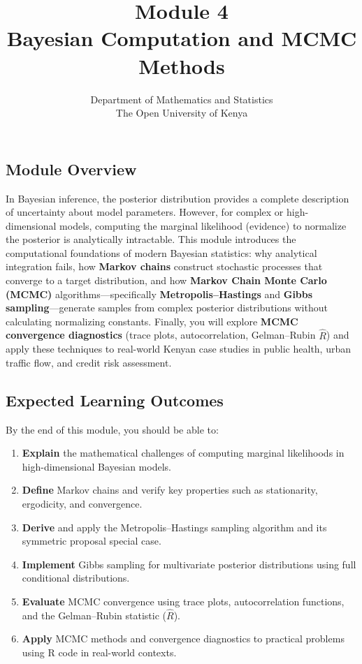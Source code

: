 \documentclass[12pt,a4paper]{article}
\title{\color{moduleblue}\Huge \textbf{Module 4}\\[0.3em]
\Large Bayesian Computation and MCMC Methods}
\author{Department of Mathematics and Statistics\\ The Open University of Kenya}
\date{}
\begin{document}
\maketitle

\begin{tcolorbox}[colback=moduleblue!6, colframe=moduleblue, arc=2mm, boxrule=1pt]
\subsection*{Module Overview}
In Bayesian inference, the posterior distribution provides a complete description of uncertainty about model parameters. However, for complex or high-dimensional models, computing the marginal likelihood (evidence) to normalize the posterior is analytically intractable. This module introduces the computational foundations of modern Bayesian statistics: why analytical integration fails, how \textbf{Markov chains} construct stochastic processes that converge to a target distribution, and how \textbf{Markov Chain Monte Carlo (MCMC)} algorithms---specifically \textbf{Metropolis--Hastings} and \textbf{Gibbs sampling}---generate samples from complex posterior distributions without calculating normalizing constants. Finally, you will explore \textbf{MCMC convergence diagnostics} (trace plots, autocorrelation, Gelman--Rubin $\hat{R}$) and apply these techniques to real-world Kenyan case studies in public health, urban traffic flow, and credit risk assessment.
\end{tcolorbox}

\subsection*{Expected Learning Outcomes}

By the end of this module, you should be able to:
\begin{enumerate}
    \item \textbf{Explain} the mathematical challenges of computing marginal likelihoods in high-dimensional Bayesian models.
    \item \textbf{Define} Markov chains and verify key properties such as stationarity, ergodicity, and convergence.
    \item \textbf{Derive} and apply the Metropolis--Hastings sampling algorithm and its symmetric proposal special case.
    \item \textbf{Implement} Gibbs sampling for multivariate posterior distributions using full conditional distributions.
    \item \textbf{Evaluate} MCMC convergence using trace plots, autocorrelation functions, and the Gelman--Rubin statistic ($\hat{R}$).
    \item \textbf{Apply} MCMC methods and convergence diagnostics to practical problems using R code in real-world contexts.
\end{enumerate}
\end{document}

